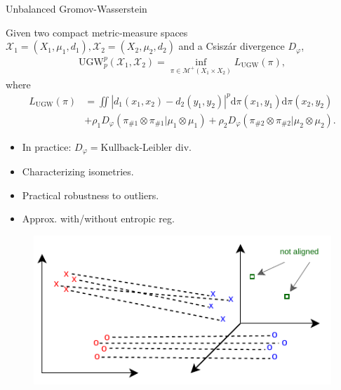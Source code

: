 \documentclass{beamer}
\newcommand{\ugw}{\text{UGW}}
\newcommand{\cX}{\mathcal X}
\newcommand{\cM}{\mathcal M}
\newcommand{\rmd}{\mathrm{d}}
\begin{document}
\begin{frame}{Unbalanced Gromov-Wasserstein}
  \vspace{-0.2cm}
  \tiny
  \begin{definition}
    Given two compact metric-measure spaces $\cX_1 = (X_1, \mu_1, d_1),
    \cX_2 = (X_2, \mu_2, d_2)$ and a Csiszár divergence $D_{\varphi}$,
    \begin{align*}
      \ugw_p^p(\cX_1, \cX_2) = \inf_{\pi \in \cM^+(X_1 \times X_2)} L_{\ugw}(\pi),
    \end{align*}
    \vspace{-0.3cm}
    where
    \begin{align*}
      L_{\ugw}(\pi) &= \iint \left| d_1(x_1, x_2) - d_2(y_1, y_2) \right|^p
      \rmd\pi(x_1, y_1) \rmd\pi(x_2, y_2) \\
      &+ \rho_1 D_{\varphi}(\pi_{\# 1} \otimes \pi_{\# 1} | \mu_1 \otimes \mu_1)
      + \rho_2 D_{\varphi}(\pi_{\# 2} \otimes \pi_{\# 2} | \mu_2 \otimes \mu_2).
    \end{align*}
  \end{definition}

  \begin{minipage}[t]{0.6\linewidth}
  \begin{itemize}
    \item In practice: $D_{\varphi} = \text{Kullback-Leibler div}$.
    \item Characterizing isometries.
    \item Practical robustness to outliers.
    \item Approx. with/without entropic reg.
  \end{itemize}
  \end{minipage}%
  \hfill%
  \hspace{-6cm}
  \begin{minipage}[t]{0.45\linewidth}
    \vspace{-0.5cm}
  \begin{figure}
    \centering
    \includegraphics[width=1.2\linewidth, keepaspectratio=true]{OT_new/ugw.pdf}
  \end{figure}
  \end{minipage}

\end{frame}
\end{document}
